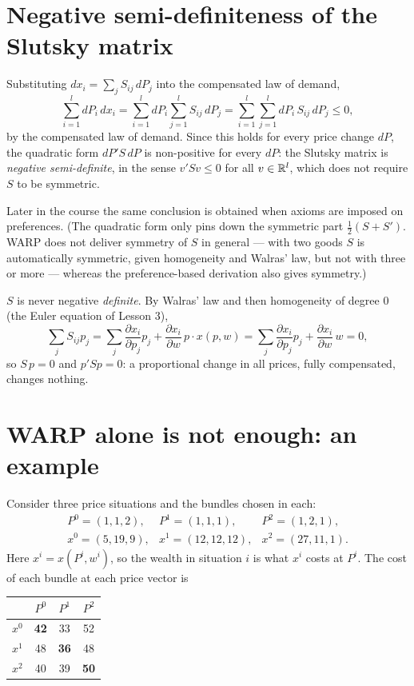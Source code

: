 \documentclass[11pt]{article}
\begin{document}
\section{Negative semi-definiteness of the Slutsky matrix}

Substituting $dx_i=\sum_j S_{ij}\,dP_j$ into the compensated law of demand,
\[
  \sum_{i=1}^{l}dP_i\,dx_i
  =\sum_{i=1}^{l}dP_i\sum_{j=1}^{l}S_{ij}\,dP_j
  =\sum_{i=1}^{l}\sum_{j=1}^{l}dP_i\,S_{ij}\,dP_j\le 0 ,
\]
by the compensated law of demand. Since this holds for every price change $dP$, the
quadratic form $dP' S\,dP$ is non-positive for every $dP$: the Slutsky matrix is
\emph{negative semi-definite}, in the sense $v'Sv\le0$ for all $v\in\mathbb{R}^{l}$, which
does not require $S$ to be symmetric.

Later in the course the same conclusion is obtained when axioms are imposed on
preferences. (The quadratic form only pins down the symmetric part
$\tfrac12(S+S')$. WARP does not deliver symmetry of $S$ in general --- with two goods
$S$ is automatically symmetric, given homogeneity and Walras' law, but not with three
or more --- whereas the preference-based derivation also gives symmetry.)

$S$ is never negative \emph{definite}. By Walras' law and then homogeneity of degree 0 (the Euler
equation of Lesson 3),
\[ \sum_{j}S_{ij}p_j=\sum_{j}\frac{\partial x_i}{\partial p_j}p_j
   +\frac{\partial x_i}{\partial w}\,p\cdot x(p,w)
   =\sum_{j}\frac{\partial x_i}{\partial p_j}p_j+\frac{\partial x_i}{\partial w}\,w=0, \]
so $S\,p=0$ and $p'Sp=0$: a proportional change in all prices, fully compensated,
changes nothing.

\section{WARP alone is not enough: an example}

Consider three price situations and the bundles chosen in each:
\[
\begin{array}{lll}
  P^{0}=(1,1,2), & P^{1}=(1,1,1), & P^{2}=(1,2,1),\\[2pt]
  x^{0}=(5,19,9), & x^{1}=(12,12,12), & x^{2}=(27,11,1).
\end{array}
\]
Here $x^{i}=x(P^{i},w^{i})$, so the wealth in situation $i$ is what $x^{i}$ costs at
$P^{i}$. The cost of each bundle at each price vector is

\begin{center}
\begin{tabular}{c|ccc}
        & $P^{0}$ & $P^{1}$ & $P^{2}$\\\hline
$x^{0}$ & \textbf{42} & 33 & 52\\
$x^{1}$ & 48 & \textbf{36} & 48\\
$x^{2}$ & 40 & 39 & \textbf{50}
\end{tabular}
\end{center}
\end{document}

